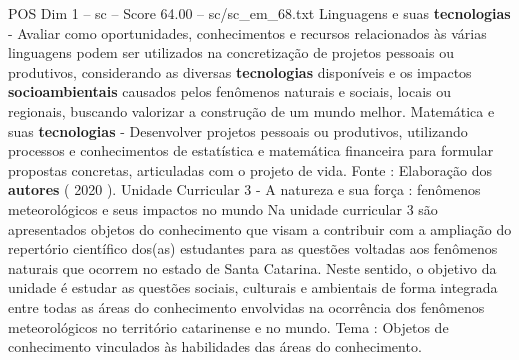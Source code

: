 \begin{textsample}{POS Dim 1 – sc – Score 64.00 – sc/sc\_em\_68.txt}
Linguagens e suas \textbf{tecnologias} - Avaliar como oportunidades, conhecimentos e recursos relacionados às várias linguagens podem ser utilizados na concretização de projetos pessoais ou produtivos, considerando as diversas \textbf{tecnologias} disponíveis e os impactos \textbf{socioambientais} causados pelos fenômenos naturais e sociais, locais ou regionais, buscando valorizar a construção de um mundo melhor.
Matemática e suas \textbf{tecnologias} - Desenvolver projetos pessoais ou produtivos, utilizando processos e conhecimentos de estatística e matemática financeira para formular propostas concretas, articuladas com o projeto de vida.
Fonte : Elaboração dos \textbf{autores} ( 2020 ).
Unidade Curricular 3 - A natureza e sua força : fenômenos meteorológicos e seus impactos no mundo Na unidade curricular 3 são apresentados objetos do conhecimento que visam a contribuir com a ampliação do repertório científico dos(as) estudantes para as questões voltadas aos fenômenos naturais que ocorrem no estado de Santa Catarina.
Neste sentido, o objetivo da unidade é estudar as questões sociais, culturais e ambientais de forma integrada entre todas as áreas do conhecimento envolvidas na ocorrência dos fenômenos meteorológicos no território catarinense e no mundo.
Tema : Objetos de conhecimento vinculados às habilidades das áreas do conhecimento.

\end{textsample}
